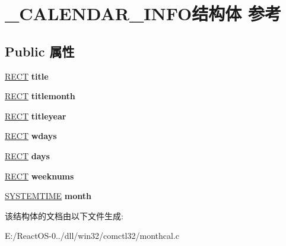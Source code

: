 \hypertarget{struct___c_a_l_e_n_d_a_r___i_n_f_o}{}\section{\+\_\+\+C\+A\+L\+E\+N\+D\+A\+R\+\_\+\+I\+N\+F\+O结构体 参考}
\label{struct___c_a_l_e_n_d_a_r___i_n_f_o}
\subsection*{Public 属性}
\begin{DoxyCompactItemize}
\item 
\mbox{\label{struct___c_a_l_e_n_d_a_r___i_n_f_o_a6a24497c56f0c60799ed9ae3e8dbd2ea}} 
\hyperlink{structtag_r_e_c_t}{R\+E\+CT} {\bfseries title}
\item 
\mbox{\label{struct___c_a_l_e_n_d_a_r___i_n_f_o_a4d82fe755cecac7e770c60dcb8c87506}} 
\hyperlink{structtag_r_e_c_t}{R\+E\+CT} {\bfseries titlemonth}
\item 
\mbox{\label{struct___c_a_l_e_n_d_a_r___i_n_f_o_a51b002cba7c78167c831a0cf3ad0d9ae}} 
\hyperlink{structtag_r_e_c_t}{R\+E\+CT} {\bfseries titleyear}
\item 
\mbox{\label{struct___c_a_l_e_n_d_a_r___i_n_f_o_abbfa9989751b1c7be358f0eb78d332ae}} 
\hyperlink{structtag_r_e_c_t}{R\+E\+CT} {\bfseries wdays}
\item 
\mbox{\label{struct___c_a_l_e_n_d_a_r___i_n_f_o_aaf8e33b594c46a605f45dfbb308dd918}} 
\hyperlink{structtag_r_e_c_t}{R\+E\+CT} {\bfseries days}
\item 
\mbox{\label{struct___c_a_l_e_n_d_a_r___i_n_f_o_a032f241b72a5f65983483bda3f7389d7}} 
\hyperlink{structtag_r_e_c_t}{R\+E\+CT} {\bfseries weeknums}
\item 
\mbox{\label{struct___c_a_l_e_n_d_a_r___i_n_f_o_ae3b6b6337e1510df059d1149114e91a0}} 
\hyperlink{struct___s_y_s_t_e_m_t_i_m_e}{S\+Y\+S\+T\+E\+M\+T\+I\+ME} {\bfseries month}
\end{DoxyCompactItemize}


该结构体的文档由以下文件生成\+:\begin{DoxyCompactItemize}
\item 
E\+:/\+React\+O\+S-\/0../dll/win32/comctl32/monthcal.\+c\end{DoxyCompactItemize}
